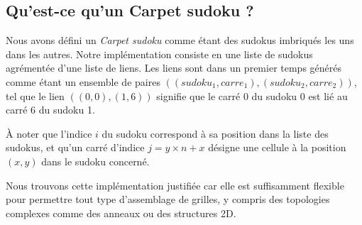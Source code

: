 \documentclass[a4paper]{article}
\begin{document}
\subsection{Qu'est-ce qu'un Carpet sudoku ?}
\begin{justify}
    \qquad Nous avons défini un \textit{Carpet sudoku} comme étant des sudokus imbriqués les uns dans les autres. Notre implémentation consiste en une liste de sudokus agrémentée d'une liste de liens. Les liens sont dans un premier temps générés comme étant un ensemble de paires $((sudoku_1, carre_1), (sudoku_2, carre_2))$, tel que le lien $((0, 0), (1, 6))$ signifie que le carré 0 du sudoku 0 est lié au carré 6 du sudoku 1.

    À noter que l’indice $i$ du sudoku correspond à sa position dans la liste des sudokus, et qu’un carré d’indice $j = y \times n + x$ désigne une cellule à la position $(x,y)$ dans le sudoku concerné.
    
    Nous trouvons cette implémentation justifiée car elle est suffisamment flexible pour permettre tout type d’assemblage de grilles, y compris des topologies complexes comme des anneaux ou des structures 2D.
\end{justify}

\label{sec:link}
\end{document}
